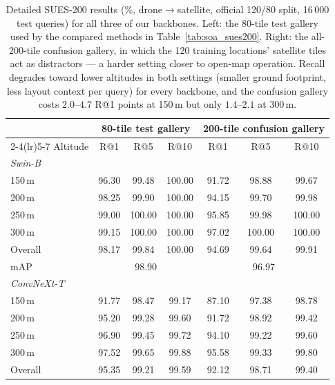 \documentclass[conference]{IEEEtran}
\begin{document}
\begin{table}[htbp]
\caption{Detailed SUES-200 results (\%, drone$\to$satellite, official
         120/80 split, 16\,000 test queries) for all three of our backbones.
         Left: the 80-tile test gallery used by the compared methods in
         Table~\ref{tab:soa_sues200}. Right: the all-200-tile confusion
         gallery, in which the 120 training locations' satellite tiles act as
         distractors — a harder setting closer to open-map operation.
         Recall degrades toward lower altitudes in both settings (smaller
         ground footprint, less layout context per query) for every backbone,
         and the confusion gallery costs $2.0$--$4.7$ R@1 points at 150\,m but
         only $1.4$--$2.1$ at 300\,m.}
\label{tab:sues200_detail}
\centering
\footnotesize
\setlength{\tabcolsep}{7pt}
\begin{tabular}{l ccc ccc}
\toprule
& \multicolumn{3}{c}{80-tile test gallery}
& \multicolumn{3}{c}{200-tile confusion gallery} \\
\cmidrule(lr){2-4}\cmidrule(lr){5-7}
Altitude & R@1 & R@5 & R@10 & R@1 & R@5 & R@10 \\
\midrule
\multicolumn{7}{l}{\textit{Swin-B}} \\
150\,m   & 96.30 & 99.48  & 100.00 & 91.72 & 98.88  & 99.67 \\
200\,m   & 98.25 & 99.90  & 100.00 & 94.15 & 99.70  & 99.98 \\
250\,m   & 99.00 & 100.00 & 100.00 & 95.85 & 99.98  & 100.00 \\
300\,m   & 99.15 & 100.00 & 100.00 & 97.02 & 100.00 & 100.00 \\
\midrule
Overall  & 98.17 & 99.84  & 100.00 & 94.69 & 99.64  & 99.91 \\
mAP      & \multicolumn{3}{c}{98.90} & \multicolumn{3}{c}{96.97} \\
\midrule
\multicolumn{7}{l}{\textit{ConvNeXt-T}} \\
150\,m   & 91.77 & 98.47  & 99.17  & 87.10 & 97.38  & 98.78 \\
200\,m   & 95.20 & 99.28  & 99.60  & 91.72 & 98.92  & 99.42 \\
250\,m   & 96.90 & 99.45  & 99.72  & 94.10 & 99.22  & 99.60 \\
300\,m   & 97.52 & 99.65  & 99.88  & 95.58 & 99.33  & 99.80 \\
\midrule
Overall  & 95.35 & 99.21  & 99.59  & 92.12 & 98.71  & 99.40 \\

\end{tabular}
\end{table}
\end{document}
